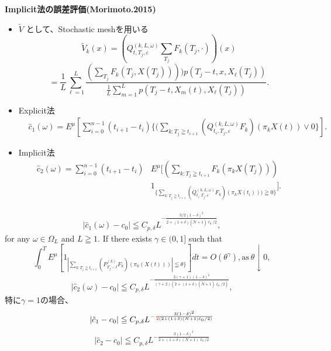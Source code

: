 \documentclass[driverfallback=dvipdfmx,cjk]{beamer}
\begin{document}
\begin{frame}
    \textbf{Implicit法の誤差評価(Morimoto.2015)}
    \begin{itemize}
        \item $\tilde{V}$ として、Stochastic meshを用いる
         $$\tilde{V}_k(x) = (Q_{t,T_j,\varepsilon}^{(k,L,\omega)}\sum_{T_j}F_k(T_j,\cdot))(x)$$
         $$ = \frac{1}{L}\sum_{\ell=1}^L\frac{(\sum_{T_j}F_k(T_j,X(T_j))) )p(T_j -t, x, X_{\ell}(T_j) )}{\frac{1}{L} \sum_{m=1}^L p(T_j -t, X_m(t), X_{\ell}(T_j) )}.$$
        \item Explicit法
        \begin{align*}
            &\hat{c}_1(\omega) =E^{\mu} [ \sum_{i=0}^{n-1}(t_{i+1}-t_{i}) \{(\sum_{k:T_j\geqq t_{i+1}} (Q_{t_i,T_j,\varepsilon}^{(k,L,\omega)}F_k)(\pi_k{X}(t))\vee0\} ].
        \end{align*}
        \item Implicit法
        \begin{align*}
            \hat{c}_2(\omega)=\sum_{i=0}^{n-1}(t_{i+1}-t_{i}) &E^{\mu}[( \sum_{k:T_j\geqq t_{i+1}}F_k(\pi_k X(T_j))) \\
             &1_{\{\sum_{k:T_j\geqq t_{i+1}} (Q_{t_i,T_j,\varepsilon}^{(k,L,\omega)}F_k)(\pi_k X(t_i))) \geqq 0\}}].
        \end{align*}
    \end{itemize}
\end{frame}

\begin{frame}
    \begin{align*}
    |\hat{c}_1(\omega)-c_0| \leqq C_{p,\delta}L^{-\frac{3/2(1-\delta)^2}{2+(1+\delta)(\tilde{N}+1)\ell_0/2}},
    \end{align*}
    for any $\omega \in \Omega_{L}$ and $L \geqq 1$.
    If there exists $\gamma \in (0,1]$ such that
$$\int_0^T E^{\mu}[ 1_{| \sum_{k:T_j\geqq t_{i+1}} (P_{T_j-t}^{(k)}F_k)(\pi_k (X(t)))| \leqq \theta\} } ]dt =O(\theta^{\gamma}), \text{as} \ \theta \downarrow 0,$$
 \begin{align*}
 |\hat{c}_2(\omega)-c_0| \leqq C_{p,\delta}L^{-\frac{3(\gamma+1)(1-\delta)^2}{(\gamma+2)(2+(1+\delta)(\tilde{N}+1)\ell_0/2)}},
 \end{align*}
特に$\gamma = 1$の場合、
$$|\hat{c}_1 - c_0| \leqq C_{p,\delta}L^{-\frac{3(1-\delta)^2}{\textcolor{red}{2}(2+(1+\delta)(N+1)\ell_0/2)}}$$ 
$$|\hat{c}_2 - c_0| \leqq C_{p,\delta}L^{-\frac{3(1-\delta)^2}{2+(1+\delta)(N+1)\ell_0/2}}$$ 
\end{frame}
\end{document}
